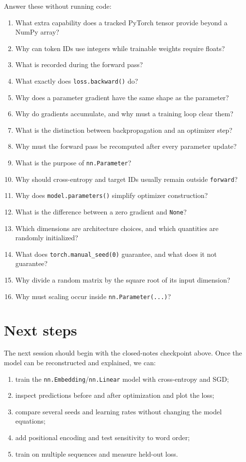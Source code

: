 \documentclass[11pt]{article}
\begin{document}
Answer these without running code:
\begin{enumerate}
\item What extra capability does a tracked PyTorch tensor provide beyond a NumPy array?
\item Why can token IDs use integers while trainable weights require floats?
\item What is recorded during the forward pass?
\item What exactly does \texttt{loss.backward()} do?
\item Why does a parameter gradient have the same shape as the parameter?
\item Why do gradients accumulate, and why must a training loop clear them?
\item What is the distinction between backpropagation and an optimizer step?
\item Why must the forward pass be recomputed after every parameter update?
\item What is the purpose of \texttt{nn.Parameter}?
\item Why should cross-entropy and target IDs usually remain outside \texttt{forward}?
\item Why does \texttt{model.parameters()} simplify optimizer construction?
\item What is the difference between a zero gradient and \texttt{None}?
\item Which dimensions are architecture choices, and which quantities are randomly initialized?
\item What does \texttt{torch.manual\_seed(0)} guarantee, and what does it not guarantee?
\item Why divide a random matrix by the square root of its input dimension?
\item Why must scaling occur inside \texttt{nn.Parameter(...)}?
\end{enumerate}

\section{Next steps}

The next session should begin with the closed-notes checkpoint above. Once the model can be reconstructed and
explained, we can:
\begin{enumerate}
\item train the \texttt{nn.Embedding}/\texttt{nn.Linear} model with cross-entropy and SGD;
\item inspect predictions before and after optimization and plot the loss;
\item compare several seeds and learning rates without changing the model equations;
\item add positional encoding and test sensitivity to word order;
\item train on multiple sequences and measure held-out loss.
\end{enumerate}
\end{document}
